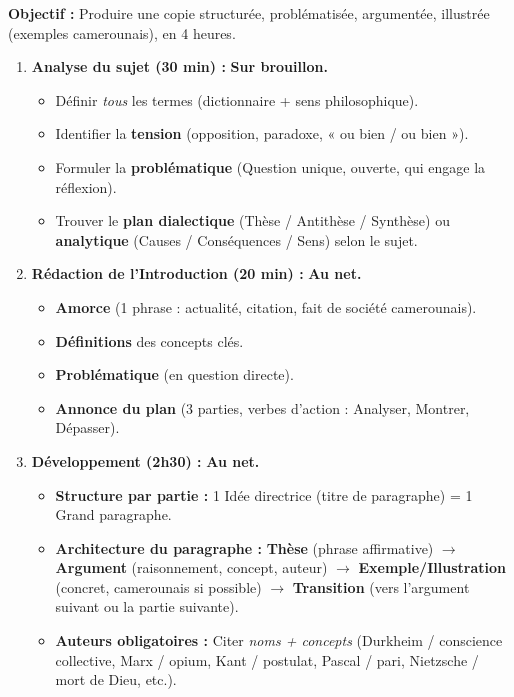 \documentclass[11pt]{article}
\begin{document}
\begin{methode}
\textbf{Objectif :} Produire une copie structurée, problématisée, argumentée, illustrée (exemples camerounais), en 4 heures.
\begin{enumerate}
    \item \textbf{Analyse du sujet (30 min) :} \textbf{Sur brouillon.}
    \begin{itemize}
        \item Définir \emph{tous} les termes (dictionnaire + sens philosophique).
        \item Identifier la \textbf{tension} (opposition, paradoxe, « ou bien / ou bien »).
        \item Formuler la \textbf{problématique} (Question unique, ouverte, qui engage la réflexion).
        \item Trouver le \textbf{plan dialectique} (Thèse / Antithèse / Synthèse) ou \textbf{analytique} (Causes / Conséquences / Sens) selon le sujet.
    \end{itemize}
    \item \textbf{Rédaction de l'Introduction (20 min) :} \textbf{Au net.}
    \begin{itemize}
        \item \textbf{Amorce} (1 phrase : actualité, citation, fait de société camerounais).
        \item \textbf{Définitions} des concepts clés.
        \item \textbf{Problématique} (en question directe).
        \item \textbf{Annonce du plan} (3 parties, verbes d'action : Analyser, Montrer, Dépasser).
    \end{itemize}
    \item \textbf{Développement (2h30) :} \textbf{Au net.}
    \begin{itemize}
        \item \textbf{Structure par partie :} 1 Idée directrice (titre de paragraphe) = 1 Grand paragraphe.
        \item \textbf{Architecture du paragraphe :} \textbf{Thèse} (phrase affirmative) $\rightarrow$ \textbf{Argument} (raisonnement, concept, auteur) $\rightarrow$ \textbf{Exemple/Illustration} (concret, camerounais si possible) $\rightarrow$ \textbf{Transition} (vers l'argument suivant ou la partie suivante).
        \item \textbf{Auteurs obligatoires :} Citer \emph{noms + concepts} (Durkheim / conscience collective, Marx / opium, Kant / postulat, Pascal / pari, Nietzsche / mort de Dieu, etc.).

\end{itemize}
\end{enumerate}
\end{methode}
\end{document}
